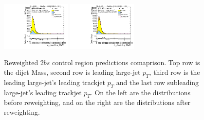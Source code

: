 \begin{figure}[htbp!]
\begin{center}
\includegraphics[width=0.31\textwidth,angle=-90]{figures/boosted/Prereweight/Moriond_TwoTag_split_Control_sublHCand_trk0_Pt.pdf}
\includegraphics[width=0.31\textwidth,angle=-90]{figures/boosted/Control/b77_TwoTag_split_Control_sublHCand_trk0_Pt.pdf}\\
\caption{Reweighted $2bs$ control region predictions comaprison. Top row is the dijet Mass, second row is leading large-\R jet $p_{T}$, third row is the leading large-\R jet's leading trackjet $p_T$ and the last row subleading large-\R jet's leading trackjet $p_T$. On the left are the distributions before reweighting, and on the right are the distributions after reweighting.}
\label{fig:rw-2bs-comp-cr}
\end{center}
\end{figure}


